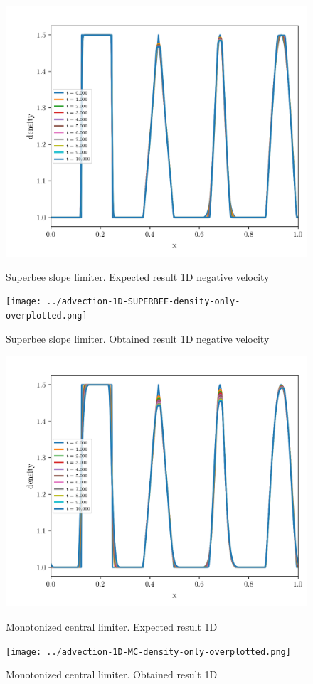     \begin{figure}[htbp]
        \centering
        \includegraphics[width=.7\textwidth]{./figures/advection-1D-SUPERBEE-density-only-overplotted.png}%
        \caption{Superbee slope limiter. Expected result 1D negative velocity}
        \texttt{[image: ../advection-1D-SUPERBEE-density-only-overplotted.png]}%
        \caption{Superbee slope limiter. Obtained result 1D negative velocity}
    \end{figure}

    \begin{figure}[htbp]
        \centering
        \includegraphics[width=.7\textwidth]{./figures/advection-1D-MC-density-only-overplotted.png}%
        \caption{Monotonized central limiter. Expected result 1D}
        \texttt{[image: ../advection-1D-MC-density-only-overplotted.png]}%
        \caption{Monotonized central limiter. Obtained result 1D}
    \end{figure}

